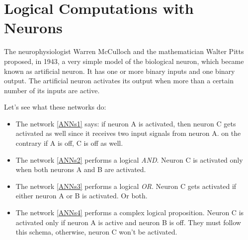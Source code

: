 \section{Logical Computations with Neurons}
The neurophysiologist Warren McCulloch and the mathematician Walter Pitts proposed, in 1943, a very simple model of the biological neuron, which became known as artificial neuron. It has one or more binary inputs and one binary output. The artificial neuron activates its output when more than a certain number of its inputs are active. 

Let's see what these networks do:
\begin{itemize}
    \item The network \ref{ANNs1} says: if neuron A is activated, then neuron C gets activated as well since it receives two input signals from neuron A. on the contrary if A is off, C is off as well.
    \item The network \ref{ANNs2} performs a logical \textit{AND}. Neuron C is activated only when both neurons A and B are activated. 
    \item The network \ref{ANNs3} performs a logical \textit{OR}. Neuron C gets activated if either neuron A or B is activated. Or both. 
    \item The network \ref{ANNs4} performs a complex logical proposition. Neuron C is activated only if neuron A is active and neuron B is off. They must follow this schema, otherwise, neuron C won't be activated. 
\end{itemize}

